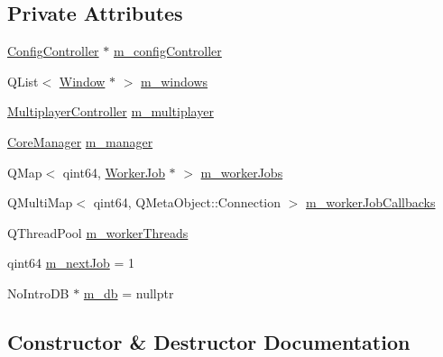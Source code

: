\subsection*{Private Attributes}
\begin{DoxyCompactItemize}
\item 
\mbox{\hyperlink{class_q_g_b_a_1_1_config_controller}{Config\+Controller}} $\ast$ \mbox{\hyperlink{class_q_g_b_a_1_1_g_b_a_app_a954a4b4ec0817e60a5f63ab00f5ab4c4}{m\+\_\+config\+Controller}}
\item 
Q\+List$<$ \mbox{\hyperlink{class_q_g_b_a_1_1_window}{Window}} $\ast$ $>$ \mbox{\hyperlink{class_q_g_b_a_1_1_g_b_a_app_a6a28511f13cd275c7527fc4bf1de3c0e}{m\+\_\+windows}}
\item 
\mbox{\hyperlink{class_q_g_b_a_1_1_multiplayer_controller}{Multiplayer\+Controller}} \mbox{\hyperlink{class_q_g_b_a_1_1_g_b_a_app_a44d77d497774d1ae4ec42ba261576496}{m\+\_\+multiplayer}}
\item 
\mbox{\hyperlink{class_q_g_b_a_1_1_core_manager}{Core\+Manager}} \mbox{\hyperlink{class_q_g_b_a_1_1_g_b_a_app_a5650686421cf448fb366e36cf72f8a47}{m\+\_\+manager}}
\item 
Q\+Map$<$ qint64, \mbox{\hyperlink{class_q_g_b_a_1_1_g_b_a_app_1_1_worker_job}{Worker\+Job}} $\ast$ $>$ \mbox{\hyperlink{class_q_g_b_a_1_1_g_b_a_app_a35ae63ee2ede8ec8c14269336b8f0f47}{m\+\_\+worker\+Jobs}}
\item 
Q\+Multi\+Map$<$ qint64, Q\+Meta\+Object\+::\+Connection $>$ \mbox{\hyperlink{class_q_g_b_a_1_1_g_b_a_app_a72330f8bfc5d08eab4edc60fd1382812}{m\+\_\+worker\+Job\+Callbacks}}
\item 
Q\+Thread\+Pool \mbox{\hyperlink{class_q_g_b_a_1_1_g_b_a_app_a7d4cfb16c298c969a400890882f31150}{m\+\_\+worker\+Threads}}
\item 
qint64 \mbox{\hyperlink{class_q_g_b_a_1_1_g_b_a_app_a36d7b88ec97bf295889cc0879da480c1}{m\+\_\+next\+Job}} = 1
\item 
No\+Intro\+DB $\ast$ \mbox{\hyperlink{class_q_g_b_a_1_1_g_b_a_app_af16809b0d3d9d52a87116310ce6d4226}{m\+\_\+db}} = nullptr
\end{DoxyCompactItemize}


\subsection{Constructor \& Destructor Documentation}
\mbox{\label{class_q_g_b_a_1_1_g_b_a_app_a00713e773289a850303d8954b0ebefbc}} 

